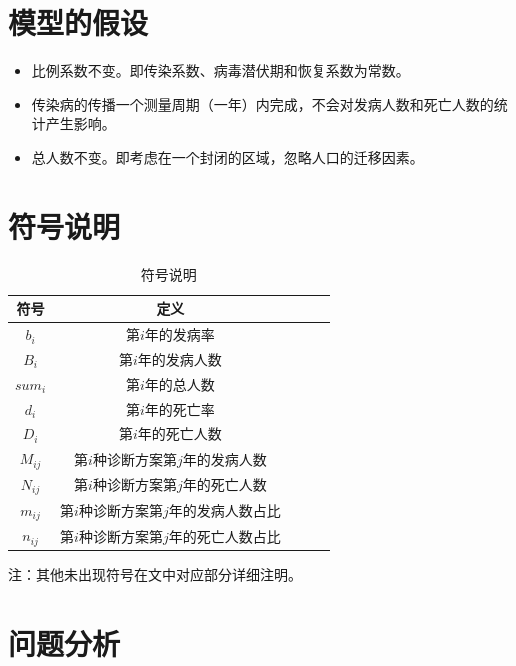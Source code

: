 \documentclass{whutmod}
\begin{document}
\section{模型的假设}
\begin{itemize}
    \item 比例系数不变。即传染系数、病毒潜伏期和恢复系数为常数。
    \item 传染病的传播一个测量周期（一年）内完成，不会对发病人数和死亡人数的统计产生影响。
    \item 总人数不变。即考虑在一个封闭的区域，忽略人口的迁移因素。
\end{itemize}

\section{符号说明}
\begin{table}[!htbp]
    \centering
    \begin{threeparttable}[b]
    \caption{符号说明}
    \label{tab001} 
	\begin{tabular}{ccccc}
		\toprule[1.5pt]
        \multicolumn{1}{m{3cm}}{\centering 符号} & \multicolumn{1}{m{6cm}}{\centering 定义} \\%
        \midrule[1pt]
        $b_i$ & 第$i$年的发病率 \\
        $B_i$ & 第$i$年的发病人数 \\
        $sum_i$ & 第$i$年的总人数 \\
        $d_i$ & 第$i$年的死亡率 \\
        $D_i$ & 第$i$年的死亡人数 \\ 
        $M_{ij}$ & 第$i$种诊断方案第$j$年的发病人数 \\
        $N_{ij}$ & 第$i$种诊断方案第$j$年的死亡人数 \\
        $m_{ij}$ & 第$i$种诊断方案第$j$年的发病人数占比 \\
        $n_{ij}$ & 第$i$种诊断方案第$j$年的死亡人数占比 \\
		\bottomrule[1.5pt]
    \end{tabular}
    \begin{tablenotes}
        \item 注：其他未出现符号在文中对应部分详细注明。
      \end{tablenotes}
     \end{threeparttable}
\end{table}
\newpage

\section{问题分析}
\end{document}

